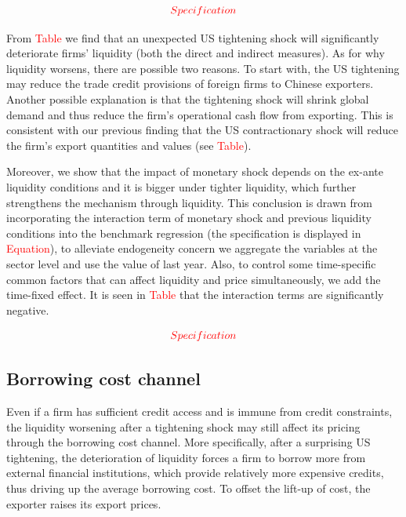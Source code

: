 $$
\textcolor{red}{Specification}
$$

From \textcolor{red}{Table} we find that an unexpected US tightening shock will significantly deteriorate firms' liquidity (both the direct and indirect measures). As for why liquidity worsens, there are possible two reasons. To start with, the US tightening may reduce the trade credit provisions of foreign firms to Chinese exporters. Another possible explanation is that the tightening shock will shrink global demand and thus reduce the firm's operational cash flow from exporting. This is consistent with our previous finding that the US contractionary shock will reduce the firm's export quantities and values (see \textcolor{red}{Table}).

Moreover, we show that the impact of monetary shock depends on the ex-ante liquidity conditions and it is bigger under tighter liquidity, which further strengthens the mechanism through liquidity. This conclusion is drawn from incorporating the interaction term of monetary shock and previous liquidity conditions into the benchmark regression (the specification is displayed in \textcolor{red}{Equation}), to alleviate endogeneity concern we aggregate the variables at the sector level and use the value of last year. Also, to control some time-specific common factors that can affect liquidity and price simultaneously, we add the time-fixed effect. It is seen in \textcolor{red}{Table} that the interaction terms are significantly negative. 


$$
\textcolor{red}{Specification}
$$


\subsection{Borrowing cost channel}

Even if a firm has sufficient credit access and is immune from credit constraints, the liquidity worsening after a tightening shock may still affect its pricing through the borrowing cost channel. More specifically, after a surprising US tightening, the deterioration of liquidity forces a firm to borrow more from external financial institutions, which provide relatively more expensive credits, thus driving up the average borrowing cost. To offset the lift-up of cost, the exporter raises its export prices. 

